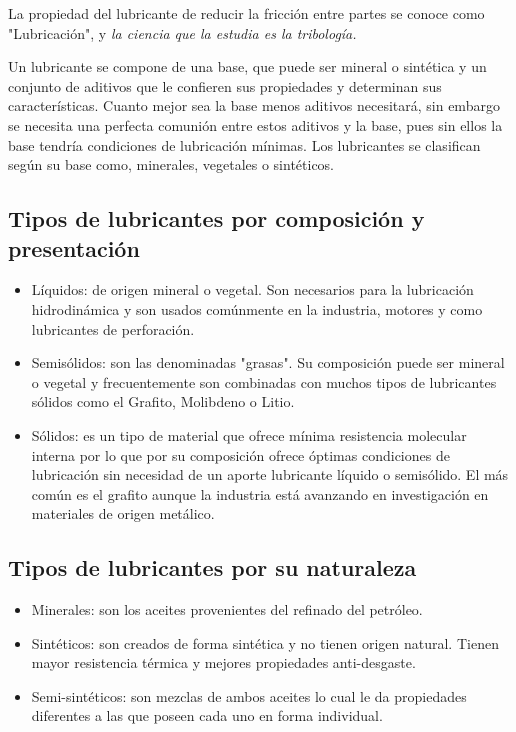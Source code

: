 La propiedad del lubricante de reducir la fricción entre partes se conoce como "Lubricación", y \emph{la ciencia que la estudia es la tribología.}

Un lubricante se compone de una base, que puede ser mineral o sintética y un conjunto de aditivos que le confieren sus propiedades y determinan sus características. Cuanto mejor sea la base menos aditivos necesitará, sin embargo se necesita una perfecta comunión entre estos aditivos y la base, pues sin ellos la base tendría condiciones de lubricación mínimas. Los lubricantes se clasifican según su base como, minerales, vegetales o sintéticos.

\subsection{Tipos de lubricantes por composición y presentación }
\begin{itemize}
     
\item Líquidos: de origen mineral o vegetal. Son necesarios para la lubricación hidrodinámica y son usados comúnmente en la industria, motores y como lubricantes de perforación.
\item Semisólidos: son las denominadas "grasas". Su composición puede ser mineral o vegetal y frecuentemente son combinadas con muchos tipos de lubricantes sólidos como el Grafito, Molibdeno o Litio.
\item Sólidos: es un tipo de material que ofrece mínima resistencia molecular interna por lo que por su composición ofrece óptimas condiciones de lubricación sin necesidad de un aporte lubricante líquido o semisólido. El más común es el grafito aunque la industria está avanzando en investigación en materiales de origen metálico.
\end{itemize}

\subsection{Tipos de lubricantes por su naturaleza }
\begin{itemize}
\item Minerales: son los aceites provenientes del refinado del petróleo.
\item Sintéticos: son creados de forma sintética y no tienen origen natural. Tienen mayor resistencia térmica y mejores propiedades anti-desgaste.
\item  Semi-sintéticos: son mezclas de ambos aceites lo cual le da propiedades diferentes a las que poseen cada uno en forma individual.
\end{itemize}



